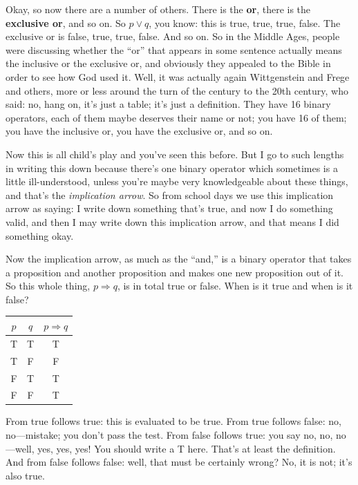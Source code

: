 Okay, so now there are a number of others. There is the \textbf{or}, there is the \textbf{exclusive or}, and so on. So $p \lor q$, you know: this is true, true, true, false. The exclusive or is false, true, true, false. And so on. So in the Middle Ages, people were discussing whether the ``or'' that appears in some sentence actually means the inclusive or the exclusive or, and obviously they appealed to the Bible in order to see how God used it. Well, it was actually again Wittgenstein and Frege and others, more or less around the turn of the century to the 20th century, who said: no, hang on, it's just a table; it's just a definition. They have 16 binary operators, each of them maybe deserves their name or not; you have 16 of them; you have the inclusive or, you have the exclusive or, and so on.

Now this is all child's play and you've seen this before. But I go to such lengths in writing this down because there's one binary operator which sometimes is a little ill-understood, unless you're maybe very knowledgeable about these things, and that's the \emph{implication arrow}. So from school days we use this implication arrow as saying: I write down something that's true, and now I do something valid, and then I may write down this implication arrow, and that means I did something okay.

Now the implication arrow, as much as the ``and,'' is a binary operator that takes a proposition and another proposition and makes one new proposition out of it. So this whole thing, $p \Rightarrow q$, is in total true or false. When is it true and when is it false?

\begin{center}
\begin{tabular}{cc|c}
$p$ & $q$ & $p \Rightarrow q$ \\
\hline
T & T & T \\
T & F & F \\
F & T & T \\
F & F & T \\
\end{tabular}
\end{center}

From true follows true: this is evaluated to be true. From true follows false: no, no---mistake; you don't pass the test. From false follows true: you say no, no, no---well, yes, yes, yes! You should write a T here. That's at least the definition. And from false follows false: well, that must be certainly wrong? No, it is not; it's also true.

